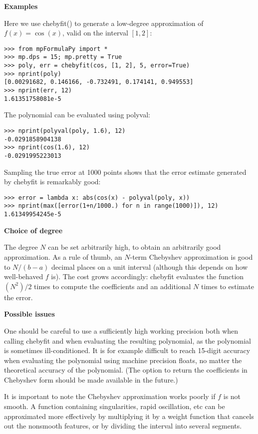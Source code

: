 \vpara
\textbf{Examples}

Here we use chebyfit() to generate a low-degree approximation of $f(x) = \cos(x)$, valid on the interval $[1,2]$:

\begin{lstlisting}
>>> from mpFormulaPy import *
>>> mp.dps = 15; mp.pretty = True
>>> poly, err = chebyfit(cos, [1, 2], 5, error=True)
>>> nprint(poly)
[0.00291682, 0.146166, -0.732491, 0.174141, 0.949553]
>>> nprint(err, 12)
1.61351758081e-5
\end{lstlisting}

The polynomial can be evaluated using polyval:

\begin{lstlisting}
>>> nprint(polyval(poly, 1.6), 12)
-0.0291858904138
>>> nprint(cos(1.6), 12)
-0.0291995223013
\end{lstlisting}

Sampling the true error at 1000 points shows that the error estimate generated by chebyfit is remarkably good:

\begin{lstlisting}
>>> error = lambda x: abs(cos(x) - polyval(poly, x))
>>> nprint(max([error(1+n/1000.) for n in range(1000)]), 12)
1.61349954245e-5
\end{lstlisting}

\vpara
\textbf{Choice of degree}

The degree $N$ can be set arbitrarily high, to obtain an arbitrarily good approximation. As a rule of thumb, an $N$-term Chebyshev approximation is good to $N/(b-a)$ decimal places on a unit interval (although this depends on how well-behaved $f$ is). The cost grows accordingly: chebyfit evaluates the function $(N^2)/2$ times to compute the coefficients and an additional $N$ times to estimate the error.

\vpara
\textbf{Possible issues}

One should be careful to use a sufficiently high working precision both when calling chebyfit and when evaluating the resulting polynomial, as the polynomial is sometimes ill-conditioned. It is for example difficult to reach 15-digit accuracy when evaluating the polynomial using machine precision floats, no matter the theoretical accuracy of the polynomial. (The option to return the coefficients in Chebyshev form should be made available in the future.)

It is important to note the Chebyshev approximation works poorly if $f$ is not smooth. A function containing singularities, rapid oscillation, etc can be approximated more effectively by multiplying it by a weight function that cancels out the nonsmooth features, or by dividing the interval into several segments.


